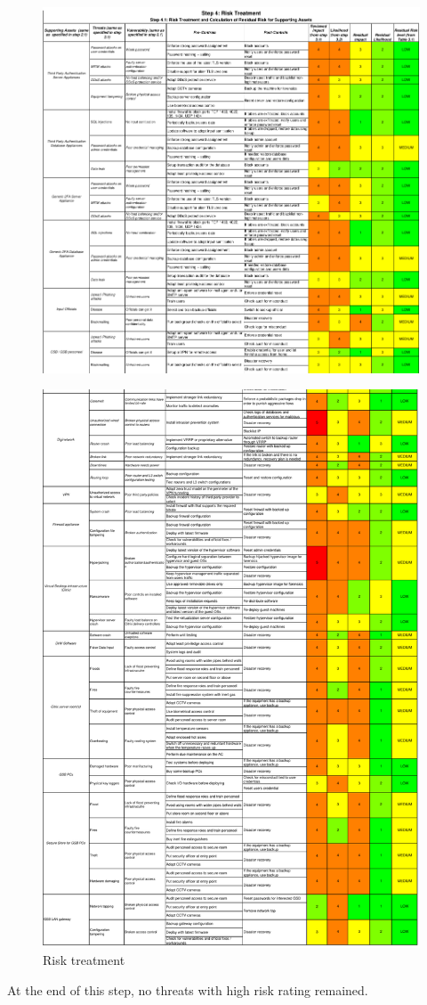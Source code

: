\begin{figure}[b!]
    \centering
    \includegraphics[keepaspectratio,width=1\textwidth]{03-risk-analysis/005-RT/img/riskTreatCut1.pdf}
    \label{fig:riskTreatCut1}
\end{figure}

\begin{figure}[t!]
    \centering
    \includegraphics[keepaspectratio,width=1\textwidth]{03-risk-analysis/005-RT/img/riskTreatCut2.pdf}
    \caption{Risk treatment}
    \label{fig:riskTreatCut2}
\end{figure}

At the end of this step, no threats with high risk rating remained.


